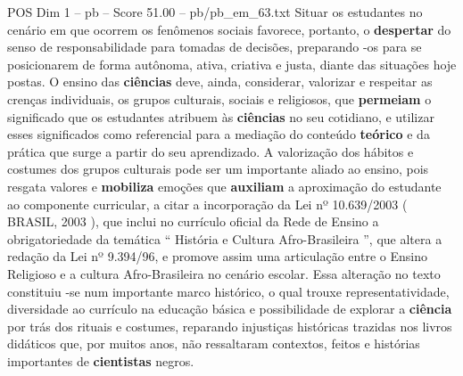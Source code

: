 \begin{textsample}{POS Dim 1 – pb – Score 51.00 – pb/pb\_em\_63.txt}
Situar os estudantes no cenário em que ocorrem os fenômenos sociais favorece, portanto, o \textbf{despertar} do senso de responsabilidade para tomadas de decisões, preparando -os para se posicionarem de forma autônoma, ativa, criativa e justa, diante das situações hoje postas.
O ensino das \textbf{ciências} deve, ainda, considerar, valorizar e respeitar as crenças individuais, os grupos culturais, sociais e religiosos, que \textbf{permeiam} o significado que os estudantes atribuem às \textbf{ciências} no seu cotidiano, e utilizar esses significados como referencial para a mediação do conteúdo \textbf{teórico} e da prática que surge a partir do seu aprendizado.
A valorização dos hábitos e costumes dos grupos culturais pode ser um importante aliado ao ensino, pois resgata valores e \textbf{mobiliza} emoções que \textbf{auxiliam} a aproximação do estudante ao componente curricular, a citar a incorporação da Lei nº 10.639/2003 ( BRASIL, 2003 ), que inclui no currículo oficial da Rede de Ensino a obrigatoriedade da temática “ História e Cultura Afro-Brasileira ”, que altera a redação da Lei nº 9.394/96, e promove assim uma articulação entre o Ensino Religioso e a cultura Afro-Brasileira no cenário escolar.
Essa alteração no texto constituiu -se num importante marco histórico, o qual trouxe representatividade, diversidade ao currículo na educação básica e possibilidade de explorar a \textbf{ciência} por trás dos rituais e costumes, reparando injustiças históricas trazidas nos livros didáticos que, por muitos anos, não ressaltaram contextos, feitos e histórias importantes de \textbf{cientistas} negros.

\end{textsample}
